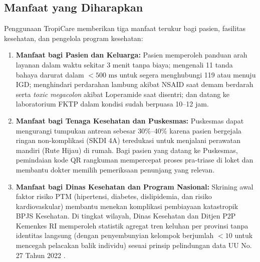 \subsection{Manfaat yang Diharapkan}

Penggunaan TropiCare memberikan tiga manfaat terukur bagi pasien, fasilitas kesehatan, dan pengelola program kesehatan:

\begin{enumerate}
    \item \textbf{Manfaat bagi Pasien dan Keluarga:}
    Pasien memperoleh panduan arah layanan dalam waktu sekitar 3 menit tanpa biaya; mengenali 11 tanda bahaya darurat dalam $<500\text{ ms}$ untuk segera menghubungi 119 atau menuju IGD; menghindari perdarahan lambung akibat NSAID saat demam berdarah serta \textit{toxic megacolon} akibat Loperamide saat disentri; dan datang ke laboratorium FKTP dalam kondisi sudah berpuasa 10--12 jam.

    \item \textbf{Manfaat bagi Tenaga Kesehatan dan Puskesmas:}
    Puskesmas dapat mengurangi tumpukan antrean sebesar 30\%--40\% karena pasien bergejala ringan non-komplikasi (SKDI 4A) teredukasi untuk menjalani perawatan mandiri (Rute Hijau) di rumah. Bagi pasien yang datang ke Puskesmas, pemindaian kode QR rangkuman mempercepat proses pra-triase di loket dan membantu dokter memilih pemeriksaan penunjang yang relevan.

    \item \textbf{Manfaat bagi Dinas Kesehatan dan Program Nasional:}
    Skrining awal faktor risiko PTM (hipertensi, diabetes, dislipidemia, dan risiko kardiovaskular) membantu menekan komplikasi pembiayaan katastropik BPJS Kesehatan. Di tingkat wilayah, Dinas Kesehatan dan Ditjen P2P Kemenkes RI memperoleh statistik agregat tren keluhan per provinsi tanpa identitas langsung (dengan penyembunyian kelompok berjumlah $<10$ untuk mencegah pelacakan balik individu) sesuai prinsip pelindungan data UU No. 27 Tahun 2022 \citep{UUPDP2022}.
\end{enumerate}
